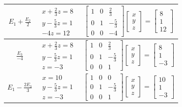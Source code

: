 \begin{center}
\begin{longtable}{|c|c|c|}
\hline
$E_1 + \frac{E_2}{2}$ & $\begin{array}{c} x +\frac{2}{3}z = 8 \\ y -\frac{5}{3}z = 1 \\ -4z = 12  \end{array}$ & $\left[\begin{array}{ccc} 1 & 0 & \frac{2}{3} \\ 0 & 1 & -\frac{5}{3} \\ 0 & 0 & -4 \end{array}\right] \left[ \begin{array}{c} x \\ y \\ z \end{array}\right] = \left[ \begin{array}{c} 8 \\ 1 \\ 12 \end{array}\right]$\\[20pt] 
\hline
$\frac{E_3}{-4}$ & $\begin{array}{c} x +\frac{2}{3}z = 8 \\ y -\frac{5}{3}z = 1 \\ z = -3  \end{array}$ & $\left[\begin{array}{ccc} 1 & 0 & \frac{2}{3} \\ 0 & 1 & -\frac{5}{3} \\ 0 & 0 & 1 \end{array}\right] \left[ \begin{array}{c} x \\ y \\ z \end{array}\right] = \left[ \begin{array}{c} 8 \\ 1 \\ -3 \end{array}\right]$\\[20pt] 
\hline
$E_1 - \frac{2E_3}{3}$ & $\begin{array}{c} x = 10 \\ y -\frac{5}{3}z = 1 \\ z = -3  \end{array}$ & $\left[\begin{array}{ccc} 1 & 0 & 0 \\ 0 & 1 & -\frac{5}{3} \\ 0 & 0 & 1 \end{array}\right] \left[ \begin{array}{c} x \\ y \\ z \end{array}\right] = \left[ \begin{array}{c} 10 \\ 1 \\ -3 \end{array}\right]$\\[20pt] 

\end{longtable}
\end{center}
